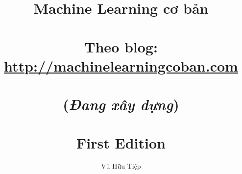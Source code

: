 \documentclass[envcountsame,envcountchap, openany]{mysvmono}
\begin{document}
\author{Vũ Hữu Tiệp}
\title{{\bf Machine Learning cơ bản}\\
\\
\small{\bf Theo blog: \url{http://machinelearningcoban.com}} \\
\\
\small{(\textit{Đang xây dựng})}\\
\\
{\small First Edition}}
\maketitle

\frontmatter%

% 
% 
\tableofcontents



\mainmatter%
% 
% 





%
%

\backmatter%
% 
% 
\printindex

\end{document}
